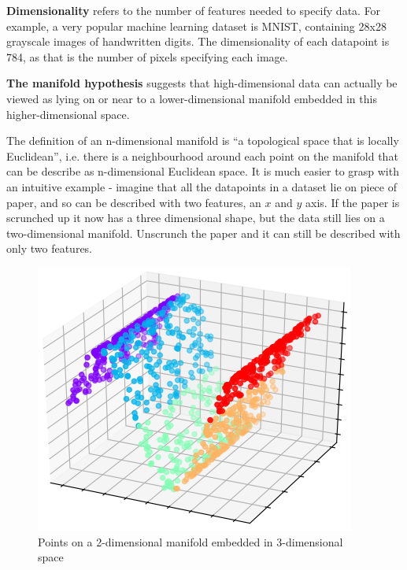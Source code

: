 \textbf{Dimensionality} refers to the number of features needed to specify data. For example, a very popular machine learning dataset
is MNIST, containing 28x28 grayscale images of handwritten digits. The dimensionality of each datapoint is 784, as that is the
number of pixels specifying each image.

\textbf{The manifold hypothesis} suggests that high-dimensional data can actually be viewed as lying on or near to a
lower-dimensional manifold embedded in this higher-dimensional space.

The definition of an n-dimensional manifold is ``a 
topological space that is locally Euclidean'', i.e. there is a neighbourhood around each point on the manifold that can be describe as n-dimensional 
Euclidean space. It is much easier to grasp with an intuitive example - imagine that all the datapoints in a 
dataset lie on piece of paper, and so can be described with two features, an $x$ and $y$ axis. If the paper is scrunched up 
it now has a three dimensional shape, but the data still lies on a two-dimensional manifold. Unscrunch the paper and it can still 
be described with only two features.
\begin{figure}[H]
  \centering
  \includegraphics[scale=.5]{figs/manifold.png}
  \caption{Points on a 2-dimensional manifold embedded in 3-dimensional space}
  \label{fig:manifold}
\end{figure}


